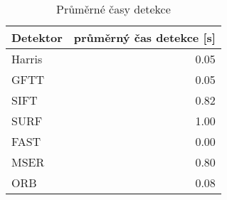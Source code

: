 \begin{table}[!ht]\centering
\begin{tabular}{ l| r }
	Detektor & průměrný čas detekce [s] \\
	\hline
	 Harris & 0.05 \\
	 GFTT & 0.05 \\
	 SIFT & 0.82 \\
	 SURF & 1.00 \\
	 FAST & 0.00 \\
	 MSER & 0.80 \\
	 ORB & 0.08
\end{tabular}
	\caption[Short Heading]{\protect Průměrné časy detekce}\label{tab_dettimes}
\end{table}